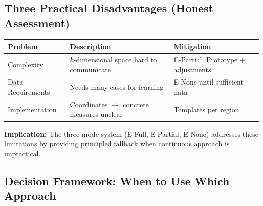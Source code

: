 \subsection{Three Practical Disadvantages (Honest Assessment)}
\label{subsec:practical-disadvantages}

\begin{tcolorbox}[colback=red!5!white, colframe=red!50!black,
    title=\textbf{Limitations of Continuous Approach}]

\begin{center}
\begin{tabular}{p{3cm}p{5cm}p{4cm}}
\toprule
\textbf{Problem} & \textbf{Description} & \textbf{Mitigation} \\
\midrule
Complexity & $k$-dimensional space hard to communicate & E-Partial: Prototype + adjustments \\
Data Requirements & Needs many cases for learning & E-None until sufficient data \\
Implementation & Coordinates $\to$ concrete measures unclear & Templates per region \\
\bottomrule
\end{tabular}
\end{center}

\textbf{Implication:} The three-mode system (E-Full, E-Partial, E-None) addresses these limitations by providing principled fallback when continuous approach is impractical.

\end{tcolorbox}

\subsection{Decision Framework: When to Use Which Approach}
\label{subsec:decision-framework-continuous}

